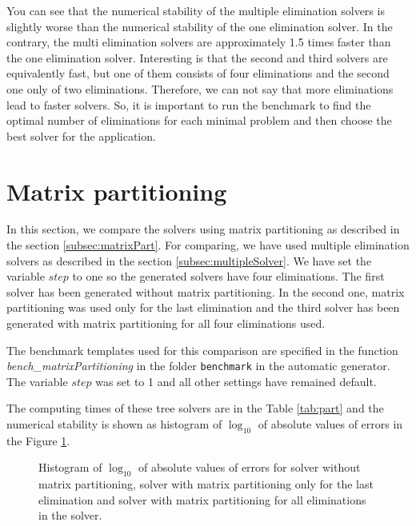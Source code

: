 You can see that the numerical stability of the multiple elimination solvers is slightly worse than the numerical stability of the one elimination solver. In the contrary, the multi elimination solvers are approximately 1.5 times faster than the one elimination solver. Interesting is that the second and third solvers are equivalently fast, but one of them consists of four eliminations and the second one only of two eliminations. Therefore, we can not say that more eliminations lead to faster solvers. So, it is important to run the benchmark to find the optimal number of eliminations for each minimal problem and then choose the best solver for the application.

\section{Matrix partitioning}
In this section, we compare the solvers using matrix partitioning as described in the section \ref{subsec:matrixPart}. For comparing, we have used multiple elimination solvers as described in the section \ref{subsec:multipleSolver}. We have set the variable $step$ to one so the generated solvers have four eliminations. The first solver has been generated without matrix partitioning. In the second one, matrix partitioning was used only for the last elimination and the third solver has been generated with matrix partitioning for all four eliminations used.

The benchmark templates used for this comparison are specified in the function \textit{bench\_\-mat\-rix\-Partitioning} in the folder \texttt{benchmark} in the automatic generator. The variable $step$ was set to 1 and all other settings have remained default.

The computing times of these tree solvers are in the Table \ref{tab:part} and the numerical stability is shown as histogram of $\log_{10}$ of absolute values of errors in the Figure \ref{graph:part}.

\begin{figure}[ht]
  \centering
  \resizebox{0.95\textwidth}{!}{}
  \caption{Histogram of $\log_{10}$ of absolute values of errors for solver without matrix partitioning, solver with matrix partitioning only for the last elimination and solver with matrix partitioning for all eliminations in the solver.}
  \label{graph:part}
\end{figure}

